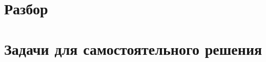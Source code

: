 \documentclass[a4paper,12pt]{article}
\begin{document}
    \iirules
    
    \section{Разбор}
    \section{Задачи для самостоятельного решения}
    \problemw
    \problem 
\end{document}
